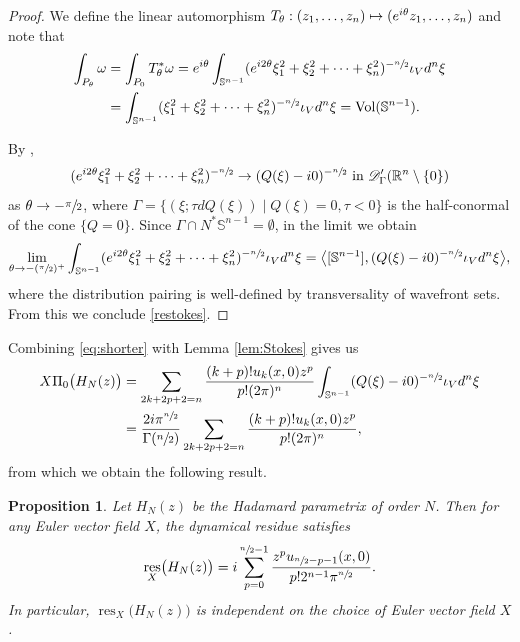 \documentclass[JEP,XML,SOM,Unicode]{cedram}
\let\pazocal\mathscr
\newcommand{\Psfrac}[2]{(\sfrac{#1}{#2})}
\def\mto{\mathchoice{\longmapsto}{\mapsto}{\mapsto}{\mapsto}}
\newtheorem{proposition}[theorem]{Proposition}
\theoremstyle{definition}
\let\st\mid
\let\euler X
\let\Feuler V
\DeclareMathOperator{\resnorm}{res}
\DeclareMathOperator*{\Vol}{Vol}
\newcommand{\resdyn}{{\resnorm_\euler}}
\begin{document}
\begin{proof}
We define the linear automorphism
$ T_\theta: (z_1,\dots,z_n)\mto (e^{i\theta}z_1,\dots,z_n) $ and
note that
\[
\begin{aligned}
\int_{P_\theta} \omega&=\int_{P_0} T_\theta^*\omega=
e^{i\theta}\int_{\mathbb{S}^{n-1}}
(e^{i2\theta}\xi_1^2+\xi_2^2+\dots+\xi_n^2)^{-\sfrac{n}{2}} \iota_\Feuler d^n\xi \\ &=\int_{\mathbb{S}^{n-1}}
(\xi_1^2+\xi_2^2+\dots+\xi_n^2)^{-\sfrac{n}{2}} \iota_\Feuler d^n\xi=\Vol(\mathbb{S}^{n-1}).
\end{aligned}
\]

By \cite[Lem.\,D.1]{Dang2020},
\[
(e^{i2\theta}\xi_1^2+\xi_2^2+\dots+\xi_n^2)^{-\sfrac{n}{2}}\to (Q(\xi)-i0)^{-\sfrac{n}{2}} \text{ in } \pazocal{D}^\prime_\Gamma(\mathbb{R}^n\setminus \{0\})
\]
as $\theta\to -\sfrac{\pi}{2}$, where
$\Gamma=\{(\xi;\tau dQ(\xi)) \st Q(\xi)=0,\tau<0 \}$ is the half-conormal of the cone $\{Q=0\}$. Since $\Gamma\cap N^*\mathbb{S}^{n-1}=\emptyset$,
in the limit we obtain
\[
\lim_{\theta\to -\Psfrac{\pi}{2}^+} \int_{\mathbb{S}^{n-1}}
(e^{i2\theta}\xi_1^2+\xi_2^2+\dots+\xi_n^2)^{-\sfrac{n}{2}} \iota_\Feuler d^n\xi= \bigl\langle [\mathbb{S}^{n-1}], (Q(\xi)-i0)^{-\sfrac{n}{2}} \iota_\Feuler d^n\xi \bigr\rangle,
\]
where the distribution pairing is well-defined
by transversality of wavefront sets.
From this we conclude \eqref{restokes}.
\end{proof}

Combining \eqref{eq:shorter} with Lemma \ref{lem:Stokes} gives us
\begin{equation*}%
\begin{aligned}
\euler\Pi_0 \big(H_N(z)\big)&=\sum_{2k+2p+2=n }
\frac{(k+p)!u_k(x,0)z^p}{p!(2\pi)^n}\int_{\mathbb{S}^{n-1}}
(Q(\xi)-i0)^{-\sfrac{n}{2}} \iota_\Feuler d^n\xi\\
&=\frac{2i\pi^{\sfrac{n}{2}}}{\Gamma(\sfrac{n}{2})}\sum_{2k+2p+2=n }
\frac{(k+p)!u_k(x,0)z^p}{p!(2\pi)^n},
\end{aligned}
\end{equation*}
from which we obtain the following result.

\begin{proposition}
Let $H_N(z)$ be the Hadamard parametrix of order $N$. Then for any Euler vector field $\euler$, the
dynamical residue satisfies
\[
\resdyn \big(H_N(z)\big)=i\sum_{p=0}^{\sfrac{n}{2}-1}
\frac{z^pu_{\sfrac{n}{2}-p-1}(x,0)}{p! 2^{n-1}\pi^{\sfrac{n}{2}}}.
\]
In particular, $\resdyn \big(H_N(z)\big)$ is independent on the choice of Euler vector field $X$.
\end{proposition}
\end{document}
